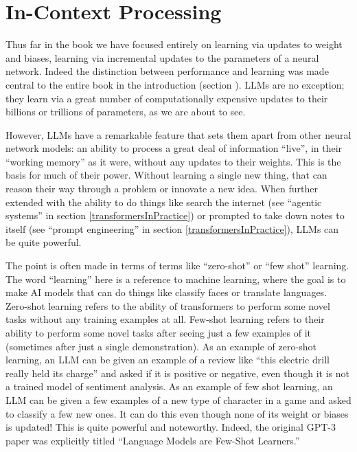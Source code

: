 \section{In-Context Processing}\label{inContext}

Thus far in the book we have focused entirely on learning via updates to weight
and biases, learning via incremental updates to the parameters of a neural
network. Indeed the distinction between performance and learning was made
central to the entire book in the introduction (section
). LLMs are no exception; they learn via a great
number of computationally expensive updates to their billions or trillions of
parameters, as we are about to see.

However, LLMs have a remarkable feature that sets them apart from other neural
network models: an ability to process a great deal of information ``live'', in
their ``working memory'' as it were, without any updates to their weights. This
is the basis for much of their power. Without learning a single new thing, that
can reason their way through a problem or innovate a new idea. When further
extended with the ability to do things like search the internet (see ``agentic
systems'' in section \ref{transformersInPractice}) or prompted to take down
notes to itself (see ``prompt engineering'' in section
\ref{transformersInPractice}), LLMs can be quite powerful.

The point is often made in terms of terms like ``zero-shot'' or ``few shot''
learning. The word ``learning'' here is a reference to machine learning, where
the goal is to make AI models that can do things like classify faces or
translate languages. Zero-shot learning refers to the ability of transformers
to perform some novel tasks without any training examples at all. Few-shot
learning refers to their ability to perform some novel tasks after seeing just
a few examples of it (sometimes after just a single demonstration). As an
example of zero-shot learning, an LLM can be given an example of a review like
``this electric drill really held its charge'' and asked if it is positive or
negative, even though it is not a trained model of sentiment analysis. As an
example of few shot learning, an LLM can be given a few examples of a new type
of character in a game and asked to classify a few new ones. It can do this
even though none of its weight or biases is updated! This is quite powerful and
noteworthy. Indeed, the original GPT-3 paper was explicitly titled ``Language
Models are Few-Shot Learners.''

